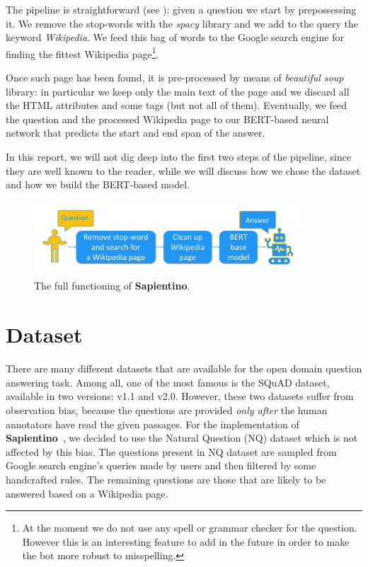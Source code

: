 \documentclass[10pt,hidelinks]{article}
\newcommand\nomefico{\textbf{Sapientino}}
\begin{document}
The pipeline is straightforward (see ): given a question we start by prepossessing it. We remove the stop-words with the \textit{spacy} library and we add to the query the keyword \textit{Wikipedia}.
We feed this bag of words to the Google search engine for finding the fittest Wikipedia page\footnote{At the moment we do not use any spell or grammar checker for the question. However this is an interesting feature to add in the future in order to make the bot more robust to misspelling.}.

Once such page has been found, it is pre-processed by means of \textit{beautiful soup} library: in particular we keep only the main text of the page and we discard all the HTML attributes and some tags (but not all of them). 
Eventually, we feed the question and the processed Wikipedia page to our BERT-based neural network that predicts the start and end span of the answer.
 
In this report, we will not dig deep into the first two steps of the pipeline, since they are well known to the reader, while we will discuss how we chose the dataset and how we build the BERT-based model.

\begin{figure}[ht!]
    \centering
    \includegraphics[width=0.9\textwidth]{report/pics/architecture_cropped.png}
    \caption{The full functioning of \nomefico.}\label{fig:tool_dataflow}
\end{figure}

\section{Dataset}\label{sec:dataset}

There are many different datasets that are available for the open domain question answering task.
Among all, one of the most famous is the SQuAD dataset, available in two versions: v1.1\cite{squad1} and v2.0\cite{squad2}.
However, these two datasets suffer from observation bias, because the questions are provided \emph{only after} the human annotators have read the given passages.
For the implementation of \nomefico~, we decided to use the Natural Question (NQ) \cite{naturalQuestion} dataset which is not affected by this bias.
The questions present in NQ dataset are sampled from Google search engine's queries made by users and then filtered by some handcrafted rules.
The remaining questions are those that are likely to be answered based on a Wikipedia page.
\end{document}
